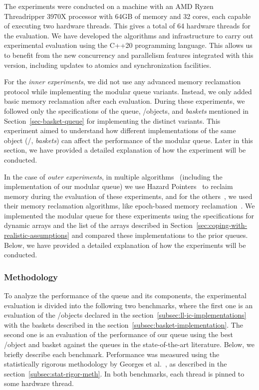 The experiments were conducted on a machine with an AMD Ryzen Threadripper 3970X processor with 64GB of memory and 32 cores, each capable of executing two hardware threads. This gives a total of 64 hardware threads for the evaluation.  We have developed the algorithms and infrastructure to carry out experimental evaluation using the C++20 programming language. This allows us to benefit from the new concurrency and parallelism features integrated with this version, including updates to atomics and synchronization facilities.

For the \textit{inner experiments}, we did not use any advanced memory reclamation protocol while implementing the modular queue variants. Instead, we only added basic memory reclamation after each evaluation. During these experiments, we followed only the specifications of the queue, \LL/\IC objects, and \textit{baskets} mentioned in Section~\ref{sec-basket-queue} for implementing the distinct variants. This experiment aimed to understand how different implementations of the same object (\LL/\IC, \textit{baskets}) can affect the performance of the modular queue. Later in this section, we have provided a detailed explanation of how the experiment will be conducted.

In the case of \textit{outer experiments}, in multiple algorithms~\cite{ DBLP_conf_podc_MichaelS96,ppopp2013x86queues, Ramalhete_Correia_MPMC_2016} (including the implementation of our modular queue) we use Hazard Pointers~\cite{DBLP_conf_podc_Michael02} to reclaim memory during the evaluation of these experiments, and for the others~\cite{scalingconcurrent2020, DBLP_conf_ppopp_YangM16}, we used their memory reclamation algorithms, like epoch-based memory reclamation~\cite{DBLP_phd_ethos_Fraser04,mckenney2001read}. We implemented the modular queue for these experiments using the specifications for dynamic arrays and the list of the arrays described in Section~\ref{sec:coping-with-realistic-assumptions} and compared these implementations to the prior queues. Below, we have provided a detailed explanation of how the experiments will be conducted.

\subsubsection{\label{subsubsec:queues-experiment-methodology}Methodology}

To analyze the performance of the queue and its components, the experimental evaluation is divided into the following two benchmarks, where the first one is an evaluation of the \LL/\IC objects declared in the section~\ref{subsec:ll-ic-implementations} with the baskets described in the section~\ref{subsec:basket-implementation}. The second one is an evaluation of the performance of our queue using the best \LL/\IC object and basket against the queues in the state-of-the-art literature. Below, we briefly describe each benchmark. Performance was measured using the statistically rigorous methodology by Georges et al.~\cite{DBLP_conf_oopsla_GeorgesBE07}, as described in the section~\ref{subsec:stat-rigor-meth}. In both benchmarks, each thread is pinned to some hardware thread.


